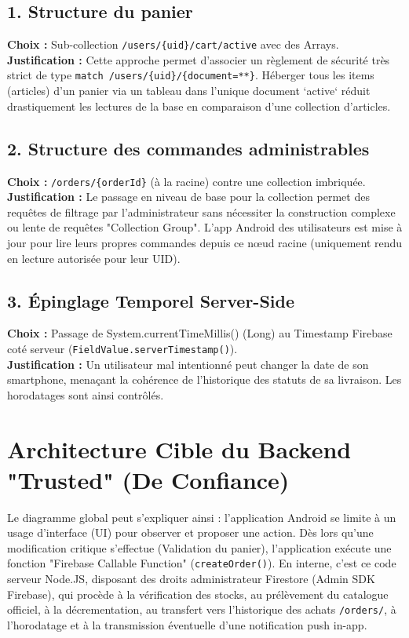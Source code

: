 \documentclass[12pt,a4paper]{report}
\begin{document}
\subsection{1. Structure du panier}
\textbf{Choix :} Sub-collection \texttt{/users/\{uid\}/cart/active} avec des Arrays.
 \\
\textbf{Justification :} Cette approche permet d'associer un règlement de sécurité très strict de type \texttt{match /users/\{uid\}/\{document=**\}}. Héberger tous les items (articles) d'un panier via un tableau dans l'unique document `active` réduit drastiquement les lectures de la base en comparaison d'une collection d'articles.

\subsection{2. Structure des commandes administrables}
\textbf{Choix :} \texttt{/orders/\{orderId\}} (à la racine) contre une collection imbriquée.
 \\
\textbf{Justification :} Le passage en niveau de base pour la collection permet des requêtes de filtrage par l'administrateur sans nécessiter la construction complexe ou lente de requêtes "Collection Group". L'app Android des utilisateurs est mise à jour pour lire leurs propres commandes depuis ce nœud racine (uniquement rendu en lecture autorisée pour leur UID).

\subsection{3. Épinglage Temporel Server-Side}
\textbf{Choix :} Passage de System.currentTimeMillis() (Long) au Timestamp Firebase coté serveur (\texttt{FieldValue.serverTimestamp()}).
 \\
\textbf{Justification :} Un utilisateur mal intentionné peut changer la date de son smartphone, menaçant la cohérence de l'historique des statuts de sa livraison. Les horodatages sont ainsi contrôlés.

\section{Architecture Cible du Backend "Trusted" (De Confiance)}
Le diagramme global peut s'expliquer ainsi : l'application Android se limite à un usage d'interface (UI) pour observer et proposer une action.
Dès lors qu'une modification critique s'effectue (Validation du panier), l'application exécute une fonction "Firebase Callable Function" (\texttt{createOrder()}). En interne, c'est ce code serveur Node.JS, disposant des droits administrateur Firestore (Admin SDK Firebase), qui procède à la vérification des stocks, au prélèvement du catalogue officiel, à la décrementation, au transfert vers l'historique des achats \texttt{/orders/}, à l'horodatage et à la transmission éventuelle d'une notification push in-app.
\end{document}
